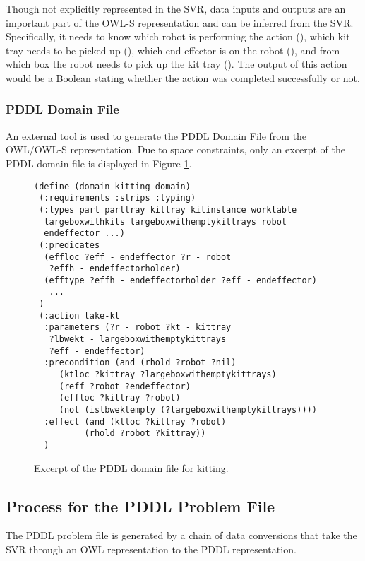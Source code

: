 Though not explicitly represented in the SVR, data inputs and outputs are an important part of the OWL-S representation and can be inferred from the SVR. Specifically, it needs to know which robot is performing the action (), which kit tray needs to be picked up (), which end effector is on the robot (), and from which box the robot needs to pick up the kit tray (). The output of this action would be a Boolean stating whether the action was completed successfully or not.

\subsubsection{PDDL Domain File}
An external tool is used to generate the PDDL Domain File from the OWL/OWL-S representation. Due to space constraints, only an excerpt of the PDDL domain file is displayed in Figure \ref{fig:domainfile}.

\begin{figure}[h!]
\begin{center}
\begin{minipage}{.5\paperwidth}
\begin{mylisting}
\begin{Verbatim}[commandchars=\\\{\},commandchars=+\[\],fontsize=\scriptsize,numbersep=3pt]
(define (domain kitting-domain)
 (:requirements :strips :typing)
 (:types part parttray kittray kitinstance worktable
  largeboxwithkits largeboxwithemptykittrays robot
  endeffector ...)
 (:predicates
  (effloc ?eff - endeffector ?r - robot
   ?effh - endeffectorholder)
  (efftype ?effh - endeffectorholder ?eff - endeffector)
   ...
 )
 (:action take-kt
  :parameters (?r - robot ?kt - kittray
   ?lbwekt - largeboxwithemptykittrays
   ?eff - endeffector)
  :precondition (and (rhold ?robot ?nil)
     (ktloc ?kittray ?largeboxwithemptykittrays)
     (reff ?robot ?endeffector)
     (effloc ?kittray ?robot)
     (not (islbwektempty (?largeboxwithemptykittrays))))
  :effect (and (ktloc ?kittray ?robot)
          (rhold ?robot ?kittray))
  )
\end{Verbatim}
\end{mylisting}
\end{minipage}
\caption{Excerpt of the PDDL domain file for kitting.\label{fig:domainfile}}
\end{center}
\end{figure}

\subsection{Process for the PDDL Problem File}
\label{subsect:PDDL_Problem_File}
The PDDL problem file is generated by a chain of data conversions that take the SVR through an OWL representation to the PDDL representation.
